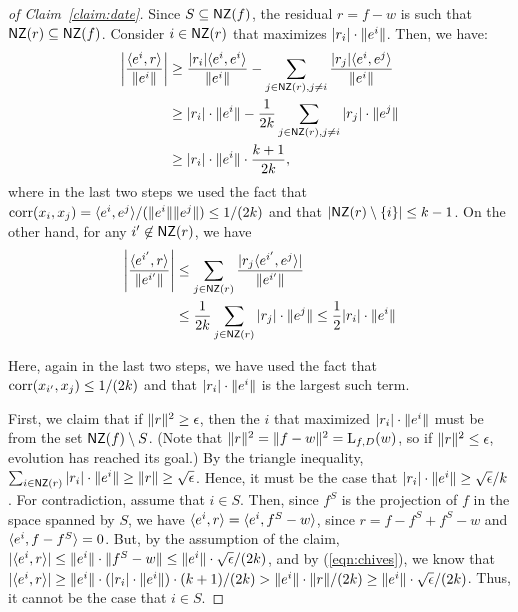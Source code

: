 \begin{proof}[of Claim~\ref{claim:date}] Since $S \subseteq \mathsf{NZ}(f)$, the
residual $r = f - w$ is such that $\mathsf{NZ}(r) \subseteq \mathsf{NZ}(f)$. Consider $i \in \mathsf{NZ}(r)$
that maximizes $|r_i|\cdot \Vert e^i \Vert$. Then, we have:
\begin{align}
\left|\frac{\langle e^i, r \rangle}{\Vert e^i \Vert} \right| &\geq
\frac{|r_i|\langle e^i, e^i \rangle}{\Vert e^i \Vert} - \sum_{j \in \mathsf{NZ}(r), j \neq i}
\frac{|r_j|\langle e^i, e^j \rangle}{\Vert e^i \Vert} \nonumber  \\
&\geq |r_i|\cdot \Vert e^i \Vert - \frac{1}{2k} \sum_{j \in \mathsf{NZ}(r), j \neq i}
|r_j| \cdot \Vert e^j \Vert \label{eqn:chives} \\
&\geq |r_i| \cdot \Vert e^i \Vert \cdot \frac{k+1}{2k}, \nonumber
\end{align}
where in the last two steps we used the fact that $\mathrm{corr}(x_i, x_j) =
\langle e^i, e^j \rangle/(\Vert e^i \Vert \Vert e^j \Vert) \leq 1/(2k)$ and that $|\mathsf{NZ}(r)
\setminus \{ i \}| \leq k-1$. On the other hand, for any $i^\prime \not\in
\mathsf{NZ}(r)$, we have
\begin{align}
\left| \frac{\langle e^{i^\prime}, r \rangle}{\Vert e^{i^\prime} \Vert} \right| &\leq
\sum_{j \in \mathsf{NZ}(r)} \frac{|r_j\langle e^{i^\prime}, e^j \rangle|}{\Vert e^{i^\prime} \Vert}
\nonumber \\
&\leq \frac{1}{2k} \sum_{j \in \mathsf{NZ}(r)} |r_j| \cdot \Vert e^j \Vert \leq \frac{1}{2}
|r_i| \cdot \Vert e^i \Vert \label{eqn:dill}
\end{align}

\noindent Here, again in the last two steps, we have used the fact that
$\mathrm{corr}(x_{i^\prime}, x_j) \leq 1/(2k)$ and that $|r_i| \cdot \Vert e^i \Vert$ is
the largest such term.

First, we claim that if $\Vert r \Vert^2 \geq \epsilon$, then the $i$ that
maximized $|r_i| \cdot \Vert e^i \Vert$ must be from the set $\mathsf{NZ}(f) \setminus
S$. (Note that $\Vert r \Vert^2 = \Vert f - w \Vert^2 = \mathrm{L}_{f, D}(w)$, so if
$\Vert r \Vert^2 \leq \epsilon$, evolution has reached its goal.) By the
triangle inequality, $\sum_{i \in \mathsf{NZ}(r)} |r_i| \cdot \Vert e^i \Vert \geq
\Vert r \Vert \geq \sqrt{\epsilon}$. Hence, it must be the case that $|r_i| \cdot
\Vert e^i \Vert \geq \sqrt{\epsilon}/{k}$. For contradiction, assume that $i \in
S$. Then, since $f^S$ is the projection of $f$ in the space spanned by $S$, we
have $\langle e^i, r \rangle = \langle e^i, f^S - w \rangle$, since $r = f - f^S + f^S - w$ and
$\langle e^i, f - f^S \rangle = 0$. But, by the assumption of the claim, $|\langle e^i, r \rangle|\leq
\Vert e^i \Vert \cdot \Vert f^S - w \Vert \leq \Vert e^i \Vert \cdot
\sqrt{\epsilon}/(2k)$, and by (\ref{eqn:chives}), we know that $|\langle e^i, r \rangle|
\geq \Vert e^i \Vert \cdot (|r_i| \cdot \Vert e^i \Vert) \cdot (k+1)/(2k) >
\Vert e^i \Vert \cdot \Vert r \Vert / (2k) \ge \Vert e^i \Vert \cdot \sqrt{\epsilon}/(2k)$.
Thus, it cannot be the case that $i \in S$.


\end{proof}
